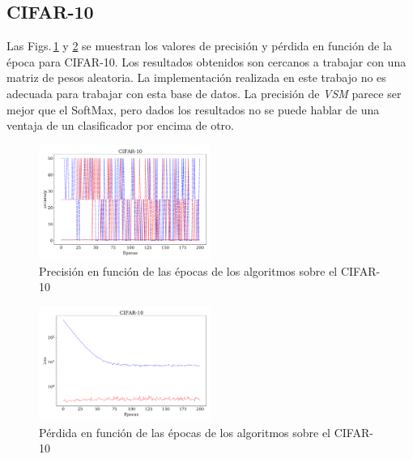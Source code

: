 \subsection*{CIFAR-10}

Las Figs.\,\ref{fig:ejer5_cifar10_acc} y \ref{fig:ejer5_cifar10_loss} se muestran los valores de precisión y pérdida en función de la época para CIFAR-10.  Los resultados obtenidos son cercanos a trabajar con una matriz de pesos aleatoria. La implementación realizada en este trabajo no es adecuada para trabajar con esta base de datos. La precisión de \emph{VSM} parece ser mejor que el SoftMax, pero dados los resultados no se puede hablar de una ventaja  de un clasificador por encima de otro.

\begin{figure}[H]
    \centering
    \includegraphics[width=0.5\textwidth]{../../ejer_5_CIFAR-10_acc.pdf}
    \caption{Precisión en función de las épocas de los algoritmos sobre el CIFAR-10}
    \label{fig:ejer5_cifar10_acc}
\end{figure} 

\begin{figure}[H]
    \centering
    \includegraphics[width=0.5\textwidth]{../../ejer_5_CIFAR-10_los.pdf}
    \caption{Pérdida en función de las épocas de los algoritmos sobre el CIFAR-10}
    \label{fig:ejer5_cifar10_loss}
\end{figure} 


